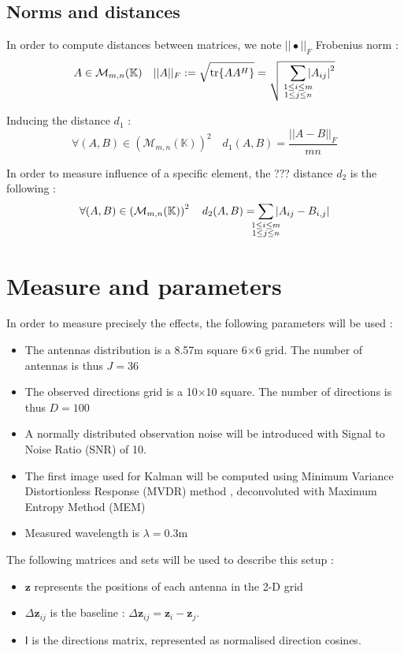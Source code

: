 \documentclass[titlepage]{article}
\newcommand{\fnorm}[1]{|\vert#1|\vert_{F}} %
\newcommand{\I}{\boldsymbol{\mathsf{I}}}
\newcommand{\z}{\boldsymbol{z}}
\newcommand{\dz}{\Delta\boldsymbol{z}}
\begin{document}
	\subsection{Norms and distances}
	
	In order to compute distances between matrices, we note $\fnorm{\bullet}$ Frobenius norm :
	$$
	A\in\mathcal{M}_{m,n}(\mathbb{K}) \quad \fnorm{A} := \sqrt{\tr{AA^H}} = \sqrt{
		\;\;\;\sum_{
			\mathclap{
				\substack{
					1\le i\le m \\1\le j\le n
				}
			}
		}\abs{A_{ij}}^2}
	$$
	
	Inducing the distance $d_1$ :
	$$
	\forall(A,B)\in\left(\mathcal{M}_{m,n}(\mathbb{K})\right)^2\quad d_1(A,B) = \frac{\fnorm{A-B}}{mn}
	$$
	
	In order to measure influence of a specific element, the ??? distance $d_2$ is the following :
	$$
	\forall(A,B)\in\left(\mathcal{M}_{m,n}(\mathbb{K})\right)^2\quad d_2(A,B) = \sum_{
		\mathclap{
			\substack{
				1\le i\le m \\1\le j\le n
			}
		}
	}\abs{A_{ij} - B_{i,j}}
	$$
	
	\section{Measure and parameters}
	
	In order to measure precisely the effects, the following parameters will be used :
	\begin{itemize}
		\item The antennas distribution is a 8.57m square 6$\times$6 grid. The number of antennas is thus $J = 36$
		\item The observed directions grid is a 10$\times$10 square. The number of directions is thus $D=100$
		\item A normally distributed observation noise will be introduced with Signal to Noise Ratio (SNR) of 10. 
		\item The first image used for Kalman will be computed using Minimum Variance Distortionless Response (MVDR) method \cite{bible}, deconvoluted with Maximum Entropy Method (MEM) \cite{MEM}
		\item Measured wavelength is $\lambda =0.3$m
	\end{itemize}

	The following matrices and sets will be used to describe this setup :
	\begin{itemize}
		\item $\z$ represents the positions of each antenna in the 2-D grid
		\item $\dz_{ij}$ is the baseline : $\dz_{ij} = \z_i - \z_j$. 
		\item $\I$ is the directions matrix, represented as normalised direction cosines.
	\end{itemize}
	
\end{document}
